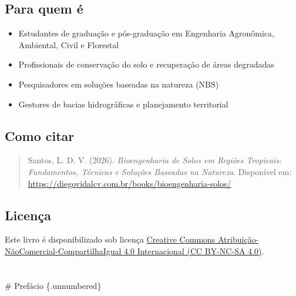 \documentclass[
  portuguese,
  11pt,
  a4paper,
  open=any]{scrbook}
\providecommand{\tightlist}{%
  \setlength{\itemsep}{0pt}\setlength{\parskip}{0pt}}
\begin{document}
\section*{Para quem é}\label{para-quem-uxe9}


\begin{itemize}
\tightlist
\item
  Estudantes de graduação e pós-graduação em Engenharia Agronômica,
  Ambiental, Civil e Florestal
\item
  Profissionais de conservação do solo e recuperação de áreas degradadas
\item
  Pesquisadores em soluções baseadas na natureza (NBS)
\item
  Gestores de bacias hidrográficas e planejamento territorial
\end{itemize}

\section*{Como citar}\label{como-citar}


\begin{quote}
Santos, L. D. V. (2026). \emph{Bioengenharia de Solos em Regiões
Tropicais: Fundamentos, Técnicas e Soluções Baseadas na Natureza}.
Disponível em:
\url{https://diegovidalcv.com.br/books/bioengenharia-solos/}
\end{quote}

\section*{Licença}\label{licenuxe7a}


Este livro é disponibilizado sob licença
\href{https://creativecommons.org/licenses/by-nc-sa/4.0/}{Creative
Commons Atribuição-NãoComercial-CompartilhaIgual 4.0 Internacional (CC
BY-NC-SA 4.0)}.


\chapter{}\label{section}

\# Prefácio \{.unnumbered\}
\end{document}

